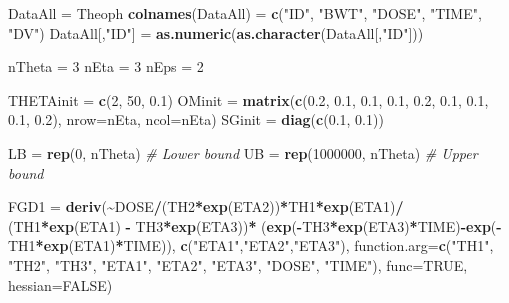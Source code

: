 \documentclass[
  10pt,
  krantz2,
  a4paper]{krantz}
\newenvironment{Shaded}{\begin{snugshade}}{\end{snugshade}}
\newcommand{\CommentTok}[1]{\textcolor[rgb]{0.56,0.35,0.01}{\textit{#1}}}
\newcommand{\DataTypeTok}[1]{\textcolor[rgb]{0.13,0.29,0.53}{#1}}
\newcommand{\DecValTok}[1]{\textcolor[rgb]{0.00,0.00,0.81}{#1}}
\newcommand{\FloatTok}[1]{\textcolor[rgb]{0.00,0.00,0.81}{#1}}
\newcommand{\KeywordTok}[1]{\textcolor[rgb]{0.13,0.29,0.53}{\textbf{#1}}}
\newcommand{\NormalTok}[1]{#1}
\newcommand{\OperatorTok}[1]{\textcolor[rgb]{0.81,0.36,0.00}{\textbf{#1}}}
\newcommand{\OtherTok}[1]{\textcolor[rgb]{0.56,0.35,0.01}{#1}}
\newcommand{\StringTok}[1]{\textcolor[rgb]{0.31,0.60,0.02}{#1}}
\theoremstyle{definition}
\theoremstyle{definition}
\theoremstyle{definition}
\theoremstyle{remark}
\begin{document}
\begin{Shaded}
\begin{Highlighting}[]
\NormalTok{DataAll =}\StringTok{ }\NormalTok{Theoph}
\KeywordTok{colnames}\NormalTok{(DataAll) =}\StringTok{ }\KeywordTok{c}\NormalTok{(}\StringTok{"ID"}\NormalTok{, }\StringTok{"BWT"}\NormalTok{, }\StringTok{"DOSE"}\NormalTok{, }\StringTok{"TIME"}\NormalTok{, }\StringTok{"DV"}\NormalTok{)}
\NormalTok{DataAll[,}\StringTok{"ID"}\NormalTok{] =}\StringTok{ }\KeywordTok{as.numeric}\NormalTok{(}\KeywordTok{as.character}\NormalTok{(DataAll[,}\StringTok{"ID"}\NormalTok{]))}

\NormalTok{nTheta =}\StringTok{ }\DecValTok{3}
\NormalTok{nEta =}\StringTok{ }\DecValTok{3}
\NormalTok{nEps =}\StringTok{ }\DecValTok{2}

\NormalTok{THETAinit =}\StringTok{ }\KeywordTok{c}\NormalTok{(}\DecValTok{2}\NormalTok{, }\DecValTok{50}\NormalTok{, }\FloatTok{0.1}\NormalTok{)}
\NormalTok{OMinit =}\StringTok{ }\KeywordTok{matrix}\NormalTok{(}\KeywordTok{c}\NormalTok{(}\FloatTok{0.2}\NormalTok{, }\FloatTok{0.1}\NormalTok{, }\FloatTok{0.1}\NormalTok{, }\FloatTok{0.1}\NormalTok{, }\FloatTok{0.2}\NormalTok{, }\FloatTok{0.1}\NormalTok{, }\FloatTok{0.1}\NormalTok{, }\FloatTok{0.1}\NormalTok{, }\FloatTok{0.2}\NormalTok{), }
                \DataTypeTok{nrow=}\NormalTok{nEta, }\DataTypeTok{ncol=}\NormalTok{nEta)}
\NormalTok{SGinit =}\StringTok{ }\KeywordTok{diag}\NormalTok{(}\KeywordTok{c}\NormalTok{(}\FloatTok{0.1}\NormalTok{, }\FloatTok{0.1}\NormalTok{))}

\NormalTok{LB =}\StringTok{ }\KeywordTok{rep}\NormalTok{(}\DecValTok{0}\NormalTok{, nTheta) }\CommentTok{\# Lower bound}
\NormalTok{UB =}\StringTok{ }\KeywordTok{rep}\NormalTok{(}\DecValTok{1000000}\NormalTok{, nTheta) }\CommentTok{\# Upper bound}

\NormalTok{FGD1 =}\StringTok{ }\KeywordTok{deriv}\NormalTok{(}\OperatorTok{\textasciitilde{}}\NormalTok{DOSE}\OperatorTok{/}\NormalTok{(TH2}\OperatorTok{*}\KeywordTok{exp}\NormalTok{(ETA2))}\OperatorTok{*}\NormalTok{TH1}\OperatorTok{*}\KeywordTok{exp}\NormalTok{(ETA1)}\OperatorTok{/}
\StringTok{             }\NormalTok{(TH1}\OperatorTok{*}\KeywordTok{exp}\NormalTok{(ETA1) }\OperatorTok{{-}}\StringTok{ }\NormalTok{TH3}\OperatorTok{*}\KeywordTok{exp}\NormalTok{(ETA3))}\OperatorTok{*}
\StringTok{             }\NormalTok{(}\KeywordTok{exp}\NormalTok{(}\OperatorTok{{-}}\NormalTok{TH3}\OperatorTok{*}\KeywordTok{exp}\NormalTok{(ETA3)}\OperatorTok{*}\NormalTok{TIME)}\OperatorTok{{-}}\KeywordTok{exp}\NormalTok{(}\OperatorTok{{-}}\NormalTok{TH1}\OperatorTok{*}\KeywordTok{exp}\NormalTok{(ETA1)}\OperatorTok{*}\NormalTok{TIME)),}
             \KeywordTok{c}\NormalTok{(}\StringTok{"ETA1"}\NormalTok{,}\StringTok{"ETA2"}\NormalTok{,}\StringTok{"ETA3"}\NormalTok{),}
             \DataTypeTok{function.arg=}\KeywordTok{c}\NormalTok{(}\StringTok{"TH1"}\NormalTok{, }\StringTok{"TH2"}\NormalTok{, }\StringTok{"TH3"}\NormalTok{, }\StringTok{"ETA1"}\NormalTok{, }\StringTok{"ETA2"}\NormalTok{, }\StringTok{"ETA3"}\NormalTok{, }
                            \StringTok{"DOSE"}\NormalTok{, }\StringTok{"TIME"}\NormalTok{),}
             \DataTypeTok{func=}\OtherTok{TRUE}\NormalTok{, }\DataTypeTok{hessian=}\OtherTok{FALSE}\NormalTok{)}


\end{Highlighting}
\end{Shaded}
\end{document}
